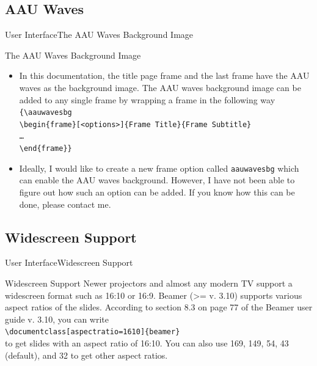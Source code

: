 \documentclass[10pt]{beamer}
\begin{document}
\subsection{AAU Waves}
\begin{frame}{User Interface}{The AAU Waves Background Image}
\begin{block}{The AAU Waves Background Image}
\begin{itemize}
  \item<1-> In this documentation, the title page frame and the last frame have the AAU waves as the background image. The AAU waves background image can be added to any single frame by wrapping a frame in the following way\\
  {\tt \{\textbackslash aauwavesbg\\
    \textbackslash begin\{frame\}[<options>]\{Frame Title\}\{Frame Subtitle\}\\
    \ldots\\
    \textbackslash end\{frame\}\}}
  \item<2-> Ideally, I would like to create a new frame option called {\tt aauwavesbg} which can enable the AAU waves background. However, I have not been able to figure out how such an option can be added. If you know how this can be done, please contact me.
\end{itemize}
\end{block}
\end{frame}

\subsection{Widescreen Support}
\begin{frame}{User Interface}{Widescreen Support}
\begin{block}{Widescreen Support}
  Newer projectors and almost any modern TV support a widescreen format such as 16:10 or 16:9. Beamer (>= v. 3.10) supports various aspect ratios of the slides. According to section 8.3 on page 77 of the Beamer user guide v. 3.10, you can write\\
{\tt\textbackslash documentclass[aspectratio=1610]\{beamer\}}\\
to get slides with an aspect ratio of 16:10. You can also use 169, 149, 54, 43 (default), and 32 to get other aspect ratios.
\end{block}
\end{frame}
\end{document}
